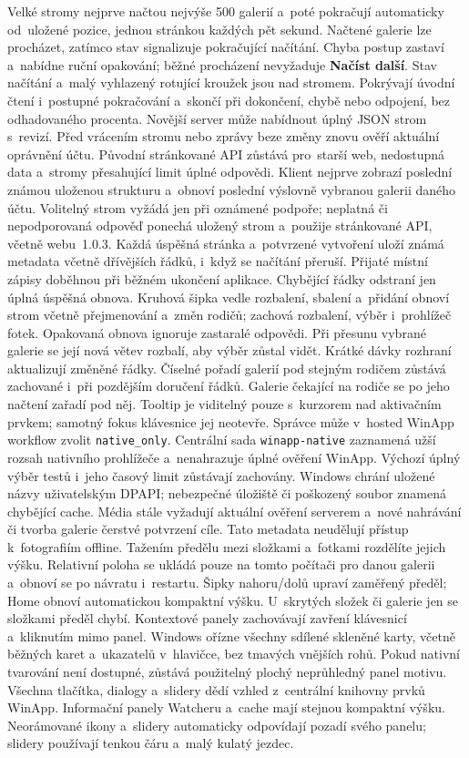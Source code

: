 \documentclass[11pt,a4paper]{article}
\newcommand{\ui}[1]{\textbf{#1}}
\begin{document}
Velké stromy nejprve načtou nejvýše 500 galerií a~poté pokračují automaticky
od~uložené pozice, jednou stránkou každých pět sekund. Načtené galerie lze
procházet, zatímco stav signalizuje pokračující načítání. Chyba postup zastaví
a~nabídne ruční opakování; běžné procházení nevyžaduje \ui{Načíst další}.
Stav načítání a~malý vyhlazený rotující kroužek jsou nad stromem.
Pokrývají úvodní čtení
i~postupné pokračování a~skončí při dokončení, chybě nebo odpojení,
bez odhadovaného procenta.
Novější server může nabídnout úplný JSON strom s~revizí. Před vrácením stromu
nebo zprávy beze změny znovu ověří aktuální oprávnění účtu. Původní
stránkované API zůstává pro~starší web, nedostupná data a~stromy přesahující
limit úplné odpovědi.
Klient nejprve zobrazí poslední známou uloženou strukturu a~obnoví poslední
výslovně vybranou galerii daného účtu. Volitelný strom vyžádá jen při oznámené
podpoře; neplatná či nepodporovaná odpověď ponechá uložený strom a~použije
stránkované API, včetně webu~1.0.3. Každá úspěšná stránka a~potvrzené vytvoření
uloží známá metadata včetně dřívějších řádků, i~když se načítání přeruší.
Přijaté místní zápisy doběhnou při běžném ukončení aplikace. Chybějící řádky
odstraní jen úplná úspěšná obnova. Kruhová šipka vedle rozbalení, sbalení
a~přidání obnoví strom včetně přejmenování a~změn rodičů; zachová rozbalení,
výběr i~prohlížeč fotek. Opakovaná obnova ignoruje zastaralé odpovědi.
Při přesunu vybrané galerie se její nová větev rozbalí, aby výběr zůstal vidět.
Krátké dávky rozhraní aktualizují změněné řádky. Číselné pořadí galerií pod
stejným rodičem zůstává zachované i~při pozdějším doručení řádků. Galerie
čekající na rodiče se po jeho načtení zařadí pod něj. Tooltip je viditelný pouze
s~kurzorem nad aktivačním prvkem; samotný fokus klávesnice jej neotevře.
Správce může v~hosted WinApp workflow zvolit \texttt{native\_only}.
Centrální sada \texttt{winapp-native} zaznamená užší rozsah nativního
prohlížeče a~nenahrazuje úplné ověření WinApp. Výchozí úplný výběr testů
i~jeho časový limit zůstávají zachovány.
Windows chrání uložené názvy uživatelským DPAPI; nebezpečné úložiště či
poškozený soubor znamená chybějící cache. Média stále vyžadují aktuální
ověření serverem a~nové nahrávání či tvorba galerie čerstvé potvrzení cíle.
Tato metadata neudělují přístup k~fotografiím offline.
Tažením předělu mezi složkami a~fotkami rozdělíte jejich výšku. Relativní poloha
se ukládá pouze na tomto počítači pro danou galerii a~obnoví se po návratu
i~restartu. Šipky nahoru/dolů upraví zaměřený předěl; Home obnoví automatickou
kompaktní výšku. U~skrytých složek či galerie jen se složkami předěl chybí.
Kontextové panely zachovávají zavření klávesnicí a~kliknutím mimo panel.
Windows ořízne všechny sdílené skleněné karty, včetně běžných karet
a~ukazatelů v~hlavičce, bez tmavých vnějších rohů. Pokud nativní tvarování není
dostupné, zůstává použitelný plochý neprůhledný panel motivu. Všechna tlačítka,
dialogy a~slidery dědí vzhled z~centrální knihovny prvků WinApp.
Informační panely Watcheru a~cache mají stejnou kompaktní výšku. Neorámované
ikony a~slidery automaticky odpovídají pozadí svého panelu; slidery používají
tenkou čáru a~malý kulatý jezdec.
\end{document}
